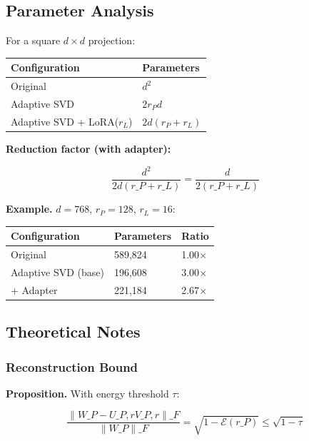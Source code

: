 \subsection{Parameter Analysis}

For a square $d \times d$ projection:

\begin{table}[H]
\centering
\small
\begin{tabular}{ll}
\toprule
\textbf{Configuration} & \textbf{Parameters} \\
\midrule
Original & $d^2$ \\
Adaptive SVD & $2 r_P d$ \\
Adaptive SVD + LoRA($r_L$) & $2 d (r_P + r_L)$ \\
\bottomrule
\end{tabular}
\end{table}

\textbf{Reduction factor (with adapter):}

\[
\frac{d^2}{2 d (r\_P + r\_L)} = \frac{d}{2(r\_P + r\_L)}
\tag{4.10}
\]

\textbf{Example.} $d = 768$, $r_P = 128$, $r_L = 16$:

\begin{table}[H]
\centering
\small
\begin{tabular}{lll}
\toprule
\textbf{Configuration} & \textbf{Parameters} & \textbf{Ratio} \\
\midrule
Original & 589,824 & 1.00$\times$ \\
Adaptive SVD (base) & 196,608 & 3.00$\times$ \\
+ Adapter & 221,184 & 2.67$\times$ \\
\bottomrule
\end{tabular}
\end{table}

\subsection{Theoretical Notes}

\subsubsection{Reconstruction Bound}

\textbf{Proposition.} With energy threshold $\tau$:

\[
\frac{\|W\_P - U\_{P, r} V\_{P, r}\|\_F}{\|W\_P\|\_F} = \sqrt{1 - \mathcal{E}(r\_P)} \leq \sqrt{1 - \tau}
\tag{4.11}
\]

